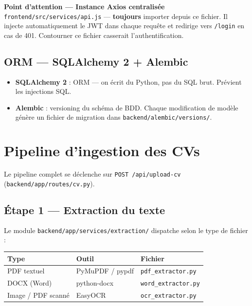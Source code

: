 \documentclass[12pt,a4paper]{report}
\newenvironment{infobox}[1][]{%
  \begin{framed}\noindent\textbf{\textcolor{navyblue}{#1}}\\[2pt]%
}{\end{framed}}
\newcommand{\filepath}[1]{\texttt{\small\textcolor{codeblue}{#1}}}
\begin{document}
\begin{infobox}[Point d'attention — Instance Axios centralisée]
  \filepath{frontend/src/services/api.js} — \textbf{toujours} importer depuis ce fichier.
  Il injecte automatiquement le JWT dans chaque requête et redirige vers \texttt{/login}
  en cas de 401. Contourner ce fichier casserait l'authentification.
\end{infobox}

\section{ORM — SQLAlchemy 2 + Alembic}

\begin{itemize}
  \item \textbf{SQLAlchemy 2} : ORM — on écrit du Python, pas du SQL brut.
        Prévient les injections SQL.
  \item \textbf{Alembic} : versioning du schéma de BDD. Chaque modification de
        modèle génère un fichier de migration dans
        \filepath{backend/alembic/versions/}.
\end{itemize}

\chapter{Pipeline d'ingestion des CVs}

Le pipeline complet se déclenche sur \texttt{POST /api/upload-cv}
(\filepath{backend/app/routes/cv.py}).

\section{Étape 1 — Extraction du texte}

Le module \filepath{backend/app/services/extraction/} dispatche selon le type de fichier :

\begin{center}
\begin{tabular}{lll}
\toprule
\textbf{Type} & \textbf{Outil} & \textbf{Fichier} \\
\midrule
PDF textuel & PyMuPDF / pypdf & \texttt{pdf\_extractor.py} \\
DOCX (Word) & python-docx & \texttt{word\_extractor.py} \\
Image / PDF scanné & EasyOCR & \texttt{ocr\_extractor.py} \\
\bottomrule
\end{tabular}
\end{center}
\end{document}
